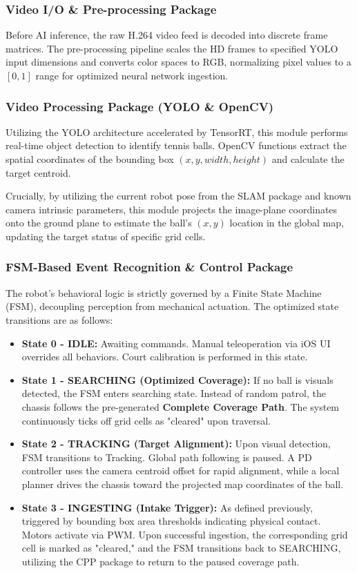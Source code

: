 \subsubsection{Video I/O \& Pre-processing Package}
\label{sec:preprocessing}
Before AI inference, the raw H.264 video feed is decoded into discrete frame matrices. The pre-processing pipeline scales the HD frames to specified YOLO input dimensions and converts color spaces to RGB, normalizing pixel values to a $[0, 1]$ range for optimized neural network ingestion.

\subsubsection{Video Processing Package (YOLO \& OpenCV)}
\label{sec:video-processing}
Utilizing the YOLO architecture accelerated by TensorRT, this module performs real-time object detection to identify tennis balls. OpenCV functions extract the spatial coordinates of the bounding box $(x, y, width, height)$ and calculate the target centroid. 

Crucially, by utilizing the current robot pose from the SLAM package and known camera intrinsic parameters, this module projects the image-plane coordinates onto the ground plane to estimate the ball's $(x, y)$ location in the global map, updating the target status of specific grid cells.

\subsubsection{FSM-Based Event Recognition \& Control Package}
\label{sec:event-recognition}
The robot's behavioral logic is strictly governed by a Finite State Machine (FSM), decoupling perception from mechanical actuation. The optimized state transitions are as follows:
\begin{itemize}
  \item \textbf{State 0 - IDLE:} Awaiting commands. Manual teleoperation via iOS UI overrides all behaviors. Court calibration is performed in this state.
  \item \textbf{State 1 - SEARCHING (Optimized Coverage):} If no ball is visuals detected, the FSM enters searching state. Instead of random patrol, the chassis follows the pre-generated \textbf{Complete Coverage Path}. The system continuously ticks off grid cells as "cleared" upon traversal.
  \item \textbf{State 2 - TRACKING (Target Alignment):} Upon visual detection, FSM transitions to Tracking. Global path following is paused. A PD controller uses the camera centroid offset for rapid alignment, while a local planner drives the chassis toward the projected map coordinates of the ball.
  \item \textbf{State 3 - INGESTING (Intake Trigger):} As defined previously, triggered by bounding box area thresholds indicating physical contact. Motors activate via PWM. Upon successful ingestion, the corresponding grid cell is marked as "cleared," and the FSM transitions back to SEARCHING, utilizing the CPP package to return to the paused coverage path.
\end{itemize}


